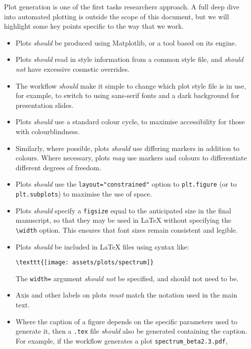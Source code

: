 \documentclass{article}
\newcommand\rfcword[1]{\emph{#1}\xspace}
\newcommand\must{\rfcword{must}}
\newcommand\should{\rfcword{should}}
\newcommand\shouldnot{\rfcword{should not}}
\newcommand\may{\rfcword{may}}
\newcommand\filename[1]{\texttt{#1}\xspace}
\begin{document}
Plot generation is one of the first tasks researchers approach.
A full deep dive into automated plotting is outside the scope of this document,
but we will highlight some key points specific to the way that we work.

\begin{itemize}
  \item
        Plots \should be produced using Matplotlib,
        or a tool based on its engine.
  \item
        Plots \should read in style information from a common style file,
        and \shouldnot have excessive cosmetic overrides.
  \item
        The workflow \should make it simple to change which plot style file is in use,
        for example,
        to switch to using sans-serif fonts and a dark background
        for presentation slides.
  \item
        Plots \should use a standard colour cycle,
        to maximise accessibility for those with colourblindness.
  \item
        Similarly,
        where possible,
        plots \should use differing markers in addition to colours.
        Where necessary,
        plots \may use markers and colours to differentiate different degrees of freedom.
  \item
        Plots \should use the \verb|layout="constrained"| option to \verb|plt.figure|
        (or to \verb|plt.subplots|)
        to maximise the use of space.
  \item
        Plots \should specify a \verb|figsize|
        equal to the anticipated size in the final manuscript,
        so that they may be used in LaTeX without specifying the \verb|\width| option.
        This ensures that font sizes remain consistent and legible.
  \item
        Plots \should be included in LaTeX files using syntax like:
\begin{verbatim}
\texttt{[image: assets/plots/spectrum]}
\end{verbatim}
        The \texttt{width=} argument \shouldnot be specified,
        and should not need to be.
  \item
        Axis and other labels on plots \must match the notation used in the main text.
  \item
        Where the caption of a figure depends on the specific parameters used to generate it,
        then a \filename{.tex} file \should also be generated containing the caption.
        For example,
        if the workflow generates a plot \filename{spectrum\_beta2.3.pdf},

\end{itemize}
\end{document}
